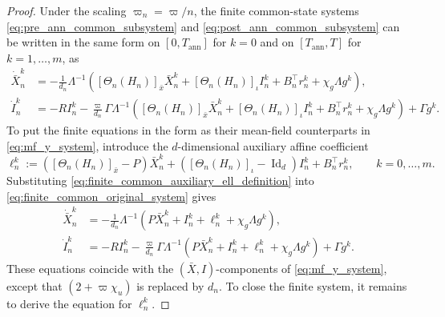 \documentclass[12pt]{article}
\numberwithin{equation}{section}
\theoremstyle{definition}
\begin{document}
\begin{proof}
Under the scaling \(\varpi_n=\varpi/n\), the finite common-state
systems \eqref{eq:pre_ann_common_subsystem} and
\eqref{eq:post_ann_common_subsystem} can be written in the same form on
\([0,T_{\mathrm{ann}}]\) for \(k=0\) and on
\([T_{\mathrm{ann}},T]\) for \(k=1,\ldots,m\), as
\begin{subequations}\label{eq:finite_common_original_system}
\begin{align}
\dot{\bar X}_n^k
&=
-\frac1{d_n}\Lambda^{-1}
\left(
[\Theta_n(H_n)]_{\bar x}\bar X_n^k
+[\Theta_n(H_n)]_{\iota}I_n^k
+B_n^\top r_n^k
+\chi_g\Lambda g^k
\right),
\label{eq:finite_common_original_X}\\
\dot I_n^k
&=
-RI_n^k
-\frac{\varpi}{d_n}\Gamma\Lambda^{-1}
\left(
[\Theta_n(H_n)]_{\bar x}\bar X_n^k
+[\Theta_n(H_n)]_{\iota}I_n^k
+B_n^\top r_n^k
+\chi_g\Lambda g^k
\right)
+\Gamma g^k.
\label{eq:finite_common_original_I}
\end{align}
\end{subequations}
To put the finite equations in the form as their mean-field counterparts in
\eqref{eq:mf_y_system}, introduce the
\(d\)-dimensional auxiliary affine coefficient
\begin{equation}\label{eq:finite_common_auxiliary_ell_definition}
\ell_n^k
:=
\left(
[\Theta_n(H_n)]_{\bar x}-P
\right)\bar X_n^k
+
\left(
[\Theta_n(H_n)]_{\iota}-\operatorname{Id}_d
\right)I_n^k
+B_n^\top r_n^k,
\qquad k=0,\ldots,m.
\end{equation}
Substituting
\eqref{eq:finite_common_auxiliary_ell_definition} into
\eqref{eq:finite_common_original_system} gives
\begin{subequations}\label{eq:finite_common_auxiliary_ell_state_system}
\begin{align}
\dot{\bar X}_n^k
&=
-\frac1{d_n}\Lambda^{-1}
\left(
P\bar X_n^k+I_n^k+\ell_n^k+\chi_g\Lambda g^k
\right),
\label{eq:finite_common_auxiliary_ell_X}\\
\dot I_n^k
&=
-RI_n^k
-\frac{\varpi}{d_n}\Gamma\Lambda^{-1}
\left(
P\bar X_n^k+I_n^k+\ell_n^k+\chi_g\Lambda g^k
\right)
+\Gamma g^k.
\label{eq:finite_common_auxiliary_ell_I}
\end{align}
\end{subequations}
These equations coincide with the \((\bar X,I)\)-components of
\eqref{eq:mf_y_system}, except that \((2+\varpi\chi_u)\) is replaced by \(d_n\).
To close the finite system, it remains to derive the equation for
\(\ell_n^k\).


\end{proof}
\end{document}
